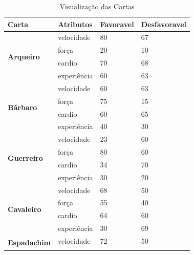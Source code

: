 \begin{table}[htb]
	\centering
	\caption{Visualização das Cartas}
	\label{tab:cartas}
	\begin{tabular}{|l|l|l|l|}
		\hline
		\textbf{Carta}                        & \textbf{Atributos} & \textbf{Favoravel} & \textbf{Desfavoravel} \\ \hline
		\multirow{4}{*}{\textbf{Arqueiro}}    & velocidade         & 80                 & 67                    \\ \cline{2-4} 
		& força              & 20                 & 10                    \\ \cline{2-4} 
		& cardio             & 70                 & 68                    \\ \cline{2-4} 
		& experiência        & 60                 & 63                    \\ \hline
		\multirow{4}{*}{\textbf{Bárbaro}}     & velocidade         & 60                 & 63                    \\ \cline{2-4} 
		& força              & 75                 & 15                    \\ \cline{2-4} 
		& cardio             & 60                 & 65                    \\ \cline{2-4} 
		& experiência        & 40                 & 30                    \\ \hline
		\multirow{4}{*}{\textbf{Guerreiro}}   & velocidade         & 23                 & 60                    \\ \cline{2-4} 
		& força              & 80                 & 60                    \\ \cline{2-4} 
		& cardio             & 34                 & 70                    \\ \cline{2-4} 
		& experiência        & 30                 & 20                    \\ \hline
		\multirow{4}{*}{\textbf{Cavaleiro}}   & velocidade         & 68                 & 50                    \\ \cline{2-4} 
		& força              & 55                 & 40                    \\ \cline{2-4} 
		& cardio             & 64                 & 60                    \\ \cline{2-4} 
		& experiência        & 30                 & 69                    \\ \hline
		\multirow{4}{*}{\textbf{Espadachim}}  & velocidade         & 72                 & 50                    \\ \cline{2-4} 

\end{tabular}
\end{table}
